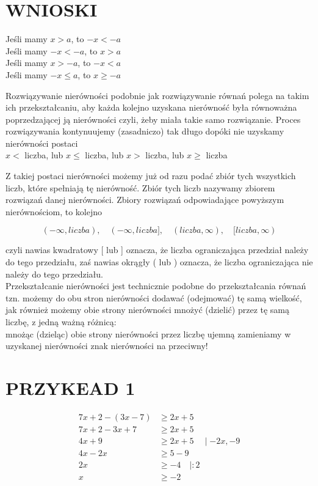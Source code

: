 \documentclass[10pt]{article}
\begin{document}
\section*{WNIOSKI}
Jeśli mamy \(x>a\), to \(-x<-a\)\\
Jeśli mamy \(-x<-a\), to \(x>a\)\\
Jeśli mamy \(x>-a\), to \(-x<a\)\\
Jeśli mamy \(-x \leqslant a\), to \(x \geqslant-a\)

Rozwiązywanie nierówności podobnie jak rozwiązywanie równań polega na takim ich przekształcaniu, aby każda kolejno uzyskana nierówność była równoważna poprzedzającej ją nierówności czyli, żeby miała takie samo rozwiązanie. Proces rozwiązywania kontynuujemy (zasadniczo) tak długo dopóki nie uzyskamy nierówności postaci\\
\(x<\) liczba, lub \(x \leqslant\) liczba, lub \(x>\) liczba, lub \(x \geqslant\) liczba

Z takiej postaci nierówności możemy już od razu podać zbiór tych wszystkich liczb, które spełniają tę nierówność. Zbiór tych liczb nazywamy zbiorem rozwiązań danej nierówności. Zbiory rozwiązań odpowiadające powyższym nierównościom, to kolejno

\[
(-\infty, l i c z b a), \quad(-\infty, l i c z b a], \quad(l i c z b a, \infty), \quad[l i c z b a, \infty)
\]

czyli nawias kwadratowy [ lub ] oznacza, że liczba ograniczająca przedział należy do tego przedziału, zaś nawias okrągły ( lub ) oznacza, że liczba ograniczająca nie należy do tego przedziału.\\
Przekształcanie nierówności jest technicznie podobne do przekształcania równań tzn. możemy do obu stron nierówności dodawać (odejmować) tę samą wielkość, jak również możemy obie strony nierówności mnożyć (dzielić) przez tę samą liczbę, z jedną ważną różnicą:\\
mnożąc (dzieląc) obie strony nierówności przez liczbę ujemną zamieniamy w uzyskanej nierówności znak nierówności na przeciwny!

\section*{PRZYKEAD 1}
\[
\begin{aligned}
7 x+2-(3 x-7) & \geqslant 2 x+5 \\
7 x+2-3 x+7 & \geqslant 2 x+5 \\
4 x+9 & \geqslant 2 x+5 \quad \mid-2 x,-9 \\
4 x-2 x & \geqslant 5-9 \\
2 x & \geqslant-4 \quad \mid: 2 \\
x & \geqslant-2
\end{aligned}
\]
\end{document}
